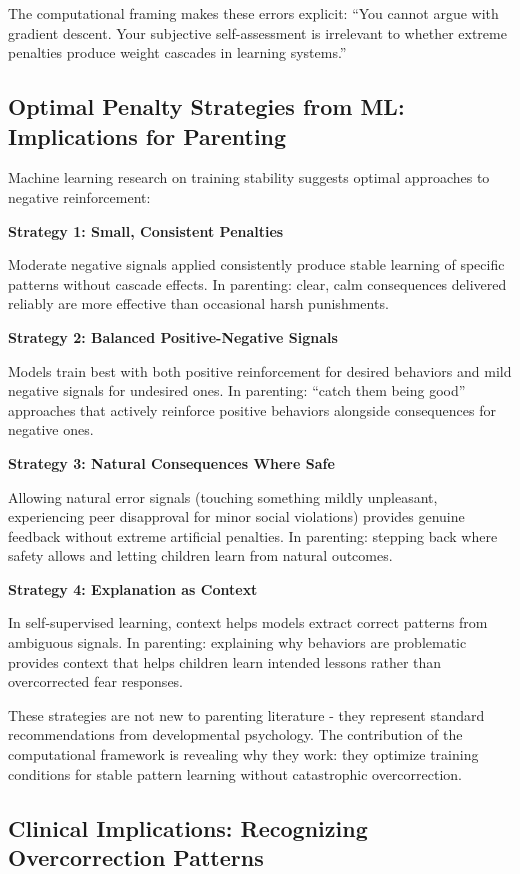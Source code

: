 \documentclass{article}
\begin{document}
The computational framing makes these errors explicit: ``You cannot argue with gradient descent. Your subjective self-assessment is irrelevant to whether extreme penalties produce weight cascades in learning systems.''

\subsection{Optimal Penalty Strategies from ML: Implications for Parenting}

Machine learning research on training stability suggests optimal approaches to negative reinforcement:

\textbf{Strategy 1: Small, Consistent Penalties}

Moderate negative signals applied consistently produce stable learning of specific patterns without cascade effects. In parenting: clear, calm consequences delivered reliably are more effective than occasional harsh punishments.

\textbf{Strategy 2: Balanced Positive-Negative Signals}

Models train best with both positive reinforcement for desired behaviors and mild negative signals for undesired ones. In parenting: ``catch them being good'' approaches that actively reinforce positive behaviors alongside consequences for negative ones.

\textbf{Strategy 3: Natural Consequences Where Safe}

Allowing natural error signals (touching something mildly unpleasant, experiencing peer disapproval for minor social violations) provides genuine feedback without extreme artificial penalties. In parenting: stepping back where safety allows and letting children learn from natural outcomes.

\textbf{Strategy 4: Explanation as Context}

In self-supervised learning, context helps models extract correct patterns from ambiguous signals. In parenting: explaining why behaviors are problematic provides context that helps children learn intended lessons rather than overcorrected fear responses.

These strategies are not new to parenting literature - they represent standard recommendations from developmental psychology. The contribution of the computational framework is revealing why they work: they optimize training conditions for stable pattern learning without catastrophic overcorrection.

\subsection{Clinical Implications: Recognizing Overcorrection Patterns}
\end{document}
